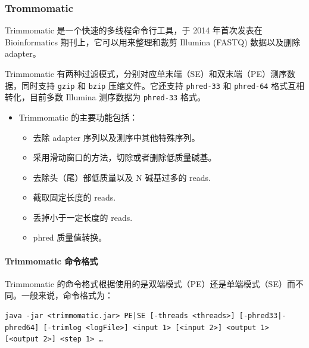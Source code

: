 \documentclass[UTF8]{ctexart}
\begin{document}
\subsubsection{Trommomatic}

Trimmomatic 是一个快速的多线程命令行工具，于 2014 年首次发表在 Bioinformatics 期刊上，它可以用来整理和裁剪 Illumina (FASTQ) 数据以及删除 adapter。

Trimmomatic 有两种过滤模式，分别对应单末端（SE）和双末端（PE）测序数据，同时支持 \verb|gzip| 和 \verb|bzip| 压缩文件。它还支持 \verb|phred-33| 和 \verb|phred-64| 格式互相转化，目前多数 Illumina 测序数据为 \verb|phred-33| 格式。

\begin{itemize}
	\item Trimmomatic 的主要功能包括：
	\begin{itemize}
		\item 去除 adapter 序列以及测序中其他特殊序列。
		\item 采用滑动窗口的方法，切除或者删除低质量碱基。
		\item 去除头（尾）部低质量以及 N 碱基过多的 reads.
		\item 截取固定长度的 reads.
		\item 丢掉小于一定长度的 reads.
		\item phred 质量值转换。
	\end{itemize}
\end{itemize}

\paragraph*{Trimmomatic 命令格式}

Trimmomatic 的命令格式根据使用的是双端模式（PE）还是单端模式（SE）而不同。一般来说，命令格式为：

\begin{lstlisting}
java -jar <trimmomatic.jar> PE|SE [-threads <threads>] [-phred33|-phred64] [-trimlog <logFile>] <input 1> [<input 2>] <output 1> [<output 2>] <step 1> …
\end{lstlisting}
\end{document}
